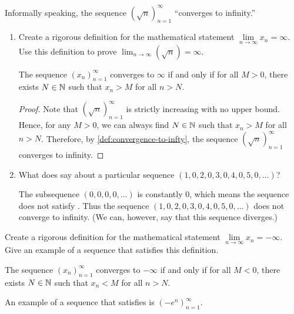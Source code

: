 \begin{problem}
  Informally speaking, the sequence $(\sqrt{n})_{n=1}^{\infty}$ ``converges to infinity.''

  \begin{enumerate}[label=(\alph*)]
      \item Create a rigorous definition for the mathematical statement $\lim\limits_{n \to \infty} x_{n} = \infty$. Use this
        definition to prove $\lim_{n \to \infty} (\sqrt{n}) = \infty$.

        \begin{definition}
          \label{def:convergence-to-infty}
          The sequence $(x_{n})_{n=1}^{\infty}$ converges to $\infty$ if and only if
          for all $M > 0$, there exists $N \in \mathbb{N}$ such that $x_{n} > M$ 
          for all $n > N$.
        \end{definition}

        \begin{proof}
          Note that $(\sqrt{n})_{n=1}^{\infty}$ is strictly increasing with no upper bound. 
          Hence, for any $M > 0$, we can always find $N \in \mathbb{N}$ such that $x_{n} > M$ for all $n > N$. 
          Therefore, by \ref{def:convergence-to-infty}, the sequence $(\sqrt{n})_{n=1}^{\infty}$ 
          converges to infinity.
        \end{proof}

      \item What does  say about a particular sequence
        $(1, 0, 2, 0, 3, 0, 4, 0, 5, 0, \ldots)$?

        The subsequence $(0, 0, 0, 0, \ldots)$ is constantly $0$, which means
        the sequence does not satisfy . Thus
        the sequence $(1, 0, 2, 0, 3, 0, 4, 0, 5, 0, \ldots)$ does not converge 
        to infinity. (We can, however, say that this sequence diverges.)

  \end{enumerate}
\end{problem}

\begin{problem}
  Create a rigorous definition for the mathematical statement $\lim\limits_{n \to \infty} x_{n} = -\infty$.
  Give an example of a sequence that satisfies this definition. 

    \begin{definition}
      \label{def:convergence-to-neg-infty}
      The sequence $(x_{n})_{n=1}^{\infty}$ converges to $-\infty$ if and only if
      for all $M < 0$, there exists $N \in \mathbb{N}$ such that $x_{n} < M$ 
      for all $n > N$.
    \end{definition}

    An example of a sequence that satisfies  is
    $(-e^{n})_{n=1}^{\infty}$.
\end{problem}

